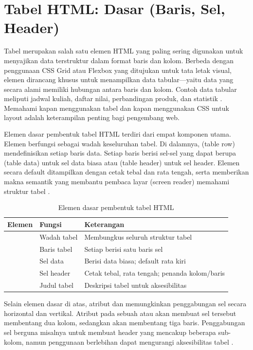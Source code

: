 ﻿\section{Tabel HTML: Dasar (Baris, Sel, Header)}

Tabel merupakan salah satu elemen HTML yang paling sering digunakan untuk menyajikan data terstruktur dalam format baris dan kolom. Berbeda dengan penggunaan CSS Grid atau Flexbox yang ditujukan untuk tata letak visual, elemen  dirancang khusus untuk menampilkan data tabular---yaitu data yang secara alami memiliki hubungan antara baris dan kolom. Contoh data tabular meliputi jadwal kuliah, daftar nilai, perbandingan produk, dan statistik \cite{mdnHtmlIntro}. Memahami kapan menggunakan tabel dan kapan menggunakan CSS untuk layout adalah keterampilan penting bagi pengembang web.

Elemen dasar pembentuk tabel HTML terdiri dari empat komponen utama. Elemen  berfungsi sebagai wadah keseluruhan tabel. Di dalamnya,  (table row) mendefinisikan setiap baris data. Setiap baris berisi sel-sel yang dapat berupa  (table data) untuk sel data biasa atau  (table header) untuk sel header. Elemen  secara default ditampilkan dengan cetak tebal dan rata tengah, serta memberikan makna semantik yang membantu pembaca layar (screen reader) memahami struktur tabel \cite{webdevHtml}.

\begin{table}[H]
\centering
\begin{tabular}{|P{2.5cm}|P{4cm}|P{5.5cm}|}
\hline
\textbf{Elemen} & \textbf{Fungsi} & \textbf{Keterangan} \\
\hline
{} & Wadah tabel & Membungkus seluruh struktur tabel \\
\hline
{} & Baris tabel & Setiap  berisi satu baris sel \\
\hline
{} & Sel data & Berisi data biasa; default rata kiri \\
\hline
{} & Sel header & Cetak tebal, rata tengah; penanda kolom/baris \\
\hline
{} & Judul tabel & Deskripsi tabel untuk aksesibilitas \\
\hline
\end{tabular}
\caption{Elemen dasar pembentuk tabel HTML}
\end{table}

Selain elemen dasar di atas, atribut  dan  memungkinkan penggabungan sel secara horizontal dan vertikal. Atribut  pada sebuah  atau  akan membuat sel tersebut membentang dua kolom, sedangkan  akan membentang tiga baris. Penggabungan sel berguna misalnya untuk membuat header yang mencakup beberapa sub-kolom, namun penggunaan berlebihan dapat mengurangi aksesibilitas tabel \cite{mdnAccessibility}.

